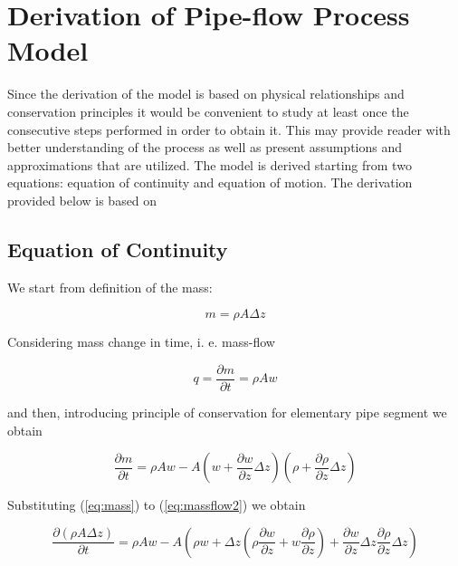 \chapter{Derivation of Pipe-flow Process Model}
\label{AppendixB}
Since the derivation of the model is based on physical relationships and conservation principles it would be convenient to study at least once the consecutive steps performed in order to obtain it. This may provide reader with better understanding of the process as well as present assumptions and approximations that are utilized. The model is derived starting from two equations: equation of continuity and equation of motion. The derivation provided below is based on %

\section{Equation of Continuity}

We start from definition of the mass:

\begin{equation}
\label{eq:mass}
m = \rho A \Delta z
\end{equation}

Considering mass change in time, i. e. mass-flow

\begin{equation}
\label{eq:massflow}
q = \frac{\partial m}{\partial t} = \rho A  w
\end{equation}

and then, introducing principle of conservation for elementary pipe segment we obtain

\begin{equation}
\label{eq:massflow2}
\frac{\partial m}{\partial t} = \rho A w - A\left(w + \frac{\partial w}{\partial z}\Delta z\right) \left( \rho + \frac{\partial \rho}{\partial z}\Delta z\right) 
\end{equation}

Substituting (\ref{eq:mass}) to  (\ref{eq:massflow2}) we obtain

\begin{equation}
\label{eq:massflow3}
\frac{\partial \left( \rho A \Delta z \right)}{\partial t} = \rho A  w - A\left( \rho w + \Delta z \left( \rho \frac{\partial w}{\partial z} +w \frac{\partial \rho}{\partial z} \right)+\frac{\partial w}{\partial z} \Delta z  \frac{\partial \rho}{\partial z} \Delta z  \right) 
\end{equation}

